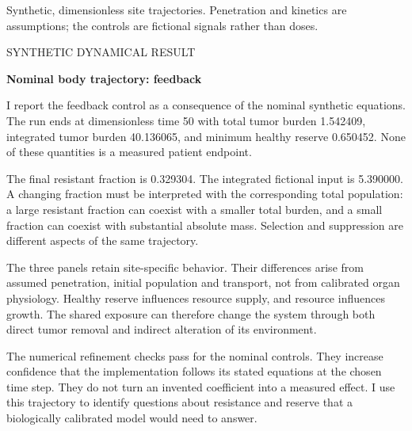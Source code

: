 \documentclass[10pt]{article}
\begin{document}
{\footnotesize\color{ink}Synthetic, dimensionless site trajectories. Penetration and kinetics are assumptions; the controls are fictional signals rather than doses.\par}
\clearpage
\hypertarget{p56}{}
{\small\color{accent}\MakeUppercase{Synthetic dynamical result}}\par
{\LARGE\bfseries\color{ink}Nominal body trajectory: feedback}\par\vspace{5pt}
I report the feedback control as a consequence of the nominal synthetic equations. The run ends at dimensionless time 50 with total tumor burden 1.542409, integrated tumor burden 40.136065, and minimum healthy reserve 0.650452. None of these quantities is a measured patient endpoint.\par
The final resistant fraction is 0.329304. The integrated fictional input is 5.390000. A changing fraction must be interpreted with the corresponding total population: a large resistant fraction can coexist with a smaller total burden, and a small fraction can coexist with substantial absolute mass. Selection and suppression are different aspects of the same trajectory.\par
The three panels retain site-specific behavior. Their differences arise from assumed penetration, initial population and transport, not from calibrated organ physiology. Healthy reserve influences resource supply, and resource influences growth. The shared exposure can therefore change the system through both direct tumor removal and indirect alteration of its environment.\par
The numerical refinement checks pass for the nominal controls. They increase confidence that the implementation follows its stated equations at the chosen time step. They do not turn an invented coefficient into a measured effect. I use this trajectory to identify questions about resistance and reserve that a biologically calibrated model would need to answer.\par
{}\par
\end{document}

